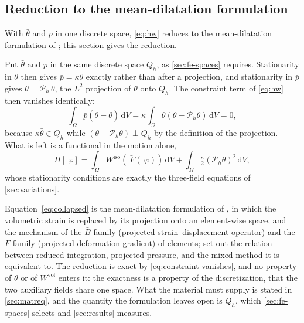 \documentclass{article}
\newcommand{\F}{~F}
\newcommand{\disp}{~\varphi}
\newcommand{\diff}{\,\mathrm{d}}
\newcommand{\supvol}{^{\mathrm{vol}}}
\newcommand{\supiso}{^{\mathrm{iso}}}
\theoremstyle{definition}
\theoremstyle{plain}
\begin{document}
\subsection{Reduction to the mean-dilatation formulation}
\label{sec:meandilatation}

With $\bar\theta$ and $\bar p$ in one discrete space, \eqref{eq:hw} reduces to
the mean-dilatation formulation of \textcite{SimoTaylorPister:1985}; this section
gives the reduction.

Put $\bar\theta$ and $\bar p$ in the same discrete space $Q_h$, as
\cref{sec:fe-spaces} requires. Stationarity in $\bar\theta$
then gives $\bar p = \kappa\bar\theta$ exactly rather than after a
projection, and stationarity in $\bar p$ gives $\bar\theta = \mathcal{P}_h\,\theta$,
the $L^2$ projection of $\theta$ onto $Q_h$. The constraint term of
\eqref{eq:hw} then vanishes identically:
\begin{equation}
  \label{eq:constraint-vanishes}
  \int_\Omega \bar p \left(\theta - \bar\theta\right) \diff V
  = \kappa \int_\Omega \bar\theta \left(\theta - \mathcal{P}_h \theta\right) \diff V = 0,
\end{equation}
because $\kappa\bar\theta \in Q_h$ while $(\theta - \mathcal{P}_h\theta) \perp Q_h$ by
the definition of the projection. What is left is a functional in the motion
alone,
\begin{equation}
  \label{eq:collapsed}
  \Pi[\disp] = \int_\Omega W\supiso\!\left(\bar{\F}(\disp)\right) \diff V
             + \int_\Omega \tfrac{\kappa}{2}\left(\mathcal{P}_h \theta\right)^2 \diff V,
\end{equation}
whose stationarity conditions are exactly the three-field equations of
\cref{sec:variations}.

Equation~\eqref{eq:collapsed} is the mean-dilatation formulation of
\textcite{SimoTaylorPister:1985}, in which the volumetric strain is replaced by
its projection onto an element-wise space, and the mechanism of the $\bar B$
family (projected strain--displacement operator) and the $\bar F$ family
(projected deformation gradient) of elements; \textcite[\S8.12]{BoffiBrezziFortin:2013}
set out the relation between reduced integration, projected pressure, and the
mixed method it is equivalent to. The reduction is exact by
\eqref{eq:constraint-vanishes}, and no property of $\theta$ or of
$W\supvol$ enters it: the exactness is a property of the discretization, that
the two auxiliary fields share one space. What the material must supply is
stated in \cref{sec:matreq}, and the quantity the formulation leaves open is
$Q_h$, which \cref{sec:fe-spaces} selects and \cref{sec:results} measures.
\end{document}
